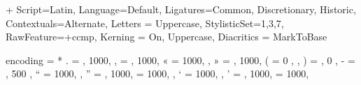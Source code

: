 
\hypersetup{
  colorlinks=true,
  allcolors=blue
}
\onehalfspacing     %

\setlength{\droptitle}{-2em}

+{
    Script=Latin,
    Language=Default,
    Ligatures={Common, Discretionary, Historic},
    Contextuals={Alternate},
    Letters = Uppercase,
    StylisticSet={1,3,7},
    RawFeature=+ccmp,
    Kerning = {On, Uppercase},
    Diacritics = {MarkToBase}
}
\setmainfont{LibertinusSerif}



\SetProtrusion
{ encoding = *}
{
  {.} = {    , 1000},
  {,} = {    , 1000},
  {«} = {1000,     },
  {»} = {    , 1000},
  {(} = { 0  ,     },
  {)} = {    , 0   },
  {-} = {    , 500 },
  \textquotedblleft
      = {1000,     },
  \textquotedblright
      = {    , 1000},
  \quotedblbase
      = {1000,     },
  \textquoteleft
      = {1000,     },
  \textquoteright
      = {    , 1000},
  \quotesinglbase
      = {1000,     }
}


\newcommand{\marginsecnumber}[1]{%
  \makebox[0pt][r]{#1\hspace{6pt}}%
}

